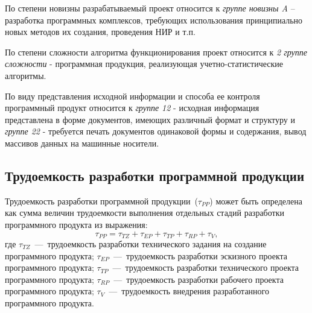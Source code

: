
    По степени новизны разрабатываемый проект относится к \textit{группе новизны A}
    – разработка программных комплексов, требующих использования принципиально
    новых методов их создания, проведения НИР и т.п.

    По степени сложности алгоритма функционирования проект относится к
    \textit{2 группе сложности} - программная продукция, реализующая
    учетно-статистические алгоритмы.

    По виду представления исходной информации и способа ее контроля программный
    продукт относится к \textit{группе 12} - исходная информация представлена в
    форме документов, имеющих различный формат и структуру и \textit{группе 22}
    - требуется печать документов одинаковой формы и содержания, вывод массивов
    данных на машинные носители.

    \subsection{Трудоемкость разработки программной продукции}
    \label{subsec:trud}
        Трудоемкость разработки программной продукции~($\tau_{PP}$) может быть
        определена как сумма величин трудоемкости выполнения отдельных стадий
        разработки программного продукта из выражения:
        $$\tau_{PP} = \tau_{TZ} + \tau_{EP} + \tau_{TP} + \tau_{RP} + \tau_{V},$$
        где $\tau_{TZ}$~---~трудоемкость разработки технического задания на создание программного продукта;
        $\tau_{EP}$~---~трудоемкость разработки эскизного проекта программного продукта;
        $\tau_{TP}$~---~трудоемкость разработки технического проекта программного продукта;
        $\tau_{RP}$~---~трудоемкость разработки рабочего проекта программного продукта;
        $\tau_{V}$~---~трудоемкость внедрения разработанного программного продукта.

